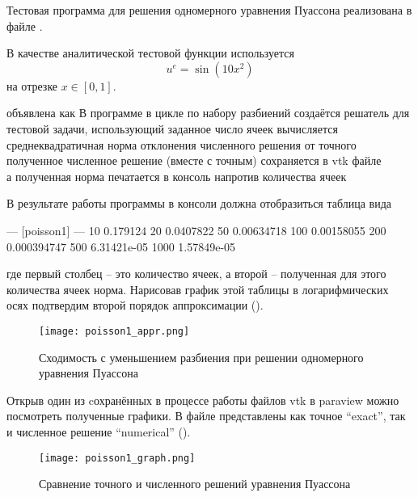 Тестовая программа для решения одномерного уравнения Пуассона 
реализована в файле .

В качестве аналитической тестовой функции  используется
\begin{equation*}
    u^e = \sin(10 x^2)
\end{equation*}
на отрезке $x\in[0,1]$.

объявлена как
В программе в цикле по набору разбиений 
создаётся решатель для тестовой задачи, использующий заданное число ячеек
вычисляется среднеквадратичная норма отклонения численного решения от точного
полученное численное решение (вместе с точным) сохраняется в vtk файле\\
а полученная норма печатается в консоль напротив количества ячеек

В результате работы программы в консоли должна отобразиться таблица вида
\begin{shelloutput}
--- [poisson1] ---
10 0.179124
20 0.0407822
50 0.00634718
100 0.00158055
200 0.000394747
500 6.31421e-05
1000 1.57849e-05
\end{shelloutput}
где первый столбец -- это количество ячеек, а второй -- полученная для этого количества ячеек норма.
Нарисовав график этой таблицы в логарифмических осях подтвердим второй порядок аппроксимации ().

\begin{figure}[h]
\centering
\texttt{[image: poisson1\_appr.png]}
\caption{Сходимость с уменьшением разбиения при решении одномерного уравнения Пуассона}
\label{fig:poisson_convergence}
\end{figure}

Открыв один из cохранённых в процессе работы файлов vtk  в paraview
можно посмотреть полученные графики. В файле представлены как точное ``exact'', так и численное решение ``numerical''
().

\begin{figure}[h]
\centering
\texttt{[image: poisson1\_graph.png]}
\caption{Сравнение точного и численного решений уравнения Пуассона}
\label{fig:poisson_graph}
\end{figure}


